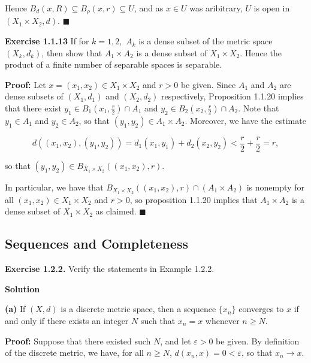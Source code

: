 \documentclass{article}
\begin{document}
Hence $B_d(x,R)\subseteq B_\rho (x,r)\subseteq U$, and as $x\in U$ was aribitrary, $U$ is open in $(X_1\times X_2,d).$ $\blacksquare$
\begin{tcolorbox}
    \textbf{Exercise 1.1.13} If for $k=1,2,$ $A_k$ is a dense subset of the metric space $(X_k,d_k)$, then show that $A_1\times A_2$ is a dense subset of $X_1\times X_2$. Hence the product of a finite number of separable spaces is separable.
\end{tcolorbox}

\textbf{Proof:} Let $x=(x_1,x_2)\in X_1\times X_2$ and $r>0$ be given. Since $A_1$ and $A_2$ are dense subsets of $(X_1,d_1)$ and $(X_2,d_2)$ respectively, Proposition 1.1.20 implies that there exist $y_1\in B_1\left(x_1,\frac{r}{2}\right)\cap A_1$ and  $y_2\in B_2\left(x_2,\frac{r}{2}\right)\cap A_2$. Note that $y_1\in A_1$ and $y_2\in A_2$, so that $(y_1,y_2)\in A_1\times A_2$. Moreover, we have the estimate

\begin{equation*}
    d((x_1,x_2),(y_1,y_2))=d_1(x_1,y_1)+d_2(x_2,y_2)<\frac{r}{2}+\frac{r}{2}=r,
\end{equation*}

so that $(y_1,y_2)\in B_{X_1\times X_2}\left((x_1,x_2),r\right)$.

In particular, we have that $ B_{X_1\times X_2}\left((x_1,x_2),r\right)\cap \left(A_1\times A_2\right)$ is nonempty for all $(x_1,x_2)\in X_1\times X_2$ and $r>0$, so proposition 1.1.20 implies that $A_1\times A_2$ is a dense subset of $X_1\times X_2$ as claimed. $\blacksquare$



\subsection{ Sequences and Completeness}
\begin{tcolorbox}
\textbf{Exercise 1.2.2.} Verify the statements in Example 1.2.2.
\end{tcolorbox}
\textbf{Solution}
\begin{tcolorbox}
\textbf{(a)} If $(X,d)$ is a discrete metric space, then a sequence $\{x_n\}$ converges to $x$ if and only if there exists an integer $N$ such that $x_n=x$ whenever $n\geq N$.
\end{tcolorbox}
\textbf{Proof:} Suppose that there existed such $N$, and let $\varepsilon>0$ be given. By definition of the discrete metric, we have, for all $n\geq N$, $d(x_n,x)=0<\varepsilon$, so that $x_n \rightarrow x$.
\end{document}
